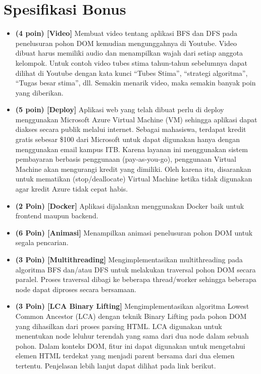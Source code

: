 \section{Spesifikasi Bonus}
\begin{itemize}
    \item \textbf{(4 poin) [Video]} Membuat video tentang aplikasi BFS dan DFS pada penelusuran pohon DOM kemudian mengunggahnya di Youtube. Video dibuat harus memiliki audio dan menampilkan wajah dari setiap anggota kelompok. Untuk contoh video tubes stima tahun-tahun sebelumnya dapat dilihat di Youtube dengan kata kunci “Tubes Stima”, “strategi algoritma”, “Tugas besar stima”, dll. Semakin menarik video, maka semakin banyak poin yang diberikan.
    \item \textbf{(5 poin) [Deploy]} Aplikasi web yang telah dibuat perlu di deploy menggunakan Microsoft Azure Virtual Machine (VM) sehingga aplikasi dapat diakses secara publik melalui internet. Sebagai mahasiswa, terdapat kredit gratis sebesar \$100 dari Microsoft untuk dapat digunakan hanya dengan menggunakan email kampus ITB. Karena layanan ini menggunakan sistem pembayaran berbasis penggunaan (pay-as-you-go), penggunaan Virtual Machine akan mengurangi kredit yang dimiliki. Oleh karena itu, disarankan untuk mematikan (stop/deallocate) Virtual Machine ketika tidak digunakan agar kredit Azure tidak cepat habis.
    \item \textbf{(2 Poin) [Docker]} Aplikasi dijalankan menggunakan Docker baik untuk frontend maupun backend.
    \item \textbf{(6 Poin) [Animasi]} Menampilkan animasi penelusuran pohon DOM untuk segala pencarian.
    \item \textbf{(3 Poin) [Multithreading]} Mengimplementasikan multithreading pada algoritma BFS dan/atau DFS untuk melakukan traversal pohon DOM secara paralel. Proses traversal dibagi ke beberapa thread/worker sehingga beberapa node dapat diproses secara bersamaan.
    \item \textbf{(3 Poin) [LCA Binary Lifting]} Mengimplementasikan algoritma Lowest Common Ancestor (LCA) dengan teknik Binary Lifting pada pohon DOM yang dihasilkan dari proses parsing HTML. LCA digunakan untuk menentukan node leluhur terendah yang sama dari dua node dalam sebuah pohon. Dalam konteks DOM, fitur ini dapat digunakan untuk mengetahui elemen HTML terdekat yang menjadi parent bersama dari dua elemen tertentu. Penjelasan lebih lanjut dapat dilihat pada link berikut.
\end{itemize}